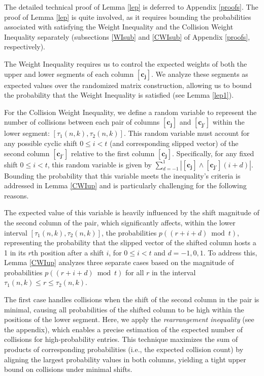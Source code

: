 \documentclass[11pt]{article}
\begin{document}
The detailed technical proof of Lemma \ref{lep} is deferred to Appendix \ref{proofs}. The proof of Lemma \ref{lep} is quite involved, as it requires bounding the probabilities associated with satisfying the Weight Inequality and the Collision Weight Inequality separately (subsections \ref{WIsub} and \ref{CWIsub} of Appendix \ref{proofs}, respectively).

The Weight Inequality requires us to control the expected weights of both the upper and lower segments of each column $\mathbf{[c_j]}$. We analyze these segments as expected values over the randomized matrix construction, allowing us to bound the probability that the Weight Inequality is satisfied (see Lemma \ref{lep1}).

For the Collision Weight Inequality, we define a random variable to represent the number of collisions between each pair of columns $\mathbf{[c_j]}$ and $\mathbf{[c_{j'}]}$ within the lower segment: $[\tau_1(n,k), \tau_2(n,k)]$. This random variable must account for any possible cyclic shift $0 \le i < t$ 
(and corresponding slipped vector) of the second column $\mathbf{[c_{j'}]}$ relative to the first column $\mathbf{[c_j]}$. Specifically, for any fixed shift $0 \le i < t$, this random variable is given by 
$\sum_{d=-1}^1 |\mathbf{[c_j]} \land \mathbf{[c_{j'}]}(i + d)|$. Bounding the probability that this 
variable meets the inequality’s criteria is addressed in Lemma \ref{CWIup} and is particularly challenging
for the following reasons.

The expected value of this variable is heavily influenced by the shift magnitude of the second column of the pair, which significantly affects, within the lower interval $[\tau_1(n,k), \tau_2(n,k)]$, the probabilities 
$p\left((r+i+d) \bmod t\right)$, representing the probability that the slipped vector of the
shifted column hosts a 1 in its $r$th position after a shift $i$, for $0 \le i < t$ and $d = -1, 0, 1$. 
To address this, Lemma \ref{CWIup} 
analyzes three separate cases based on the magnitude of probabilities $p\left((r+i+d) \bmod t\right)$ for all $r$ in the interval $\tau_1(n,k) \leq r \leq \tau_2(n,k)$.


The first case handles collisions when the shift of the second column in the pair is minimal, 
causing all probabilities of the shifted column to be high within the positions of the lower segment.
Here, we apply the \textit{rearrangement inequality} \cite{HLP1934} (see the appendix), which enables 
a precise estimation of the expected number of collisions for high-probability entries. 
This technique maximizes the sum of products of corresponding probabilities 
(i.e., the expected collision count) by aligning the largest probability values in both columns, 
yielding a tight upper bound on collisions under minimal shifts.
\end{document}
